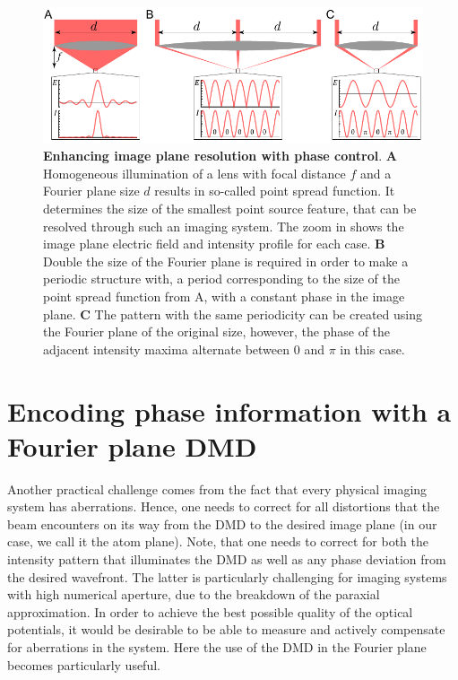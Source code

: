 \begin{figure}[t]
	\centering
	\includegraphics[scale=1]{figures/DMD_lens.pdf}
	\caption{{\bf Enhancing image plane resolution with phase control}. {\bf A} Homogeneous illumination of a lens with focal distance $f$ and a Fourier plane size $d$ results in so-called point spread function. It determines the size of the smallest point source feature, that can be resolved through such an imaging system. The zoom in shows the image plane electric field and intensity profile for each case. {\bf B} Double the size of the Fourier plane is required in order to make a periodic structure with, a period corresponding to the size of the point spread function from A, with a constant phase in the image plane. {\bf C} The pattern with the same periodicity can be created using the Fourier plane of the original size, however, the phase of the adjacent intensity maxima alternate between $0$ and $\pi$ in this case.}
	\label{fig:DMD_lens}
\end{figure}

\section{Encoding phase information with a Fourier plane DMD}
Another practical challenge comes from the fact that every physical imaging system has aberrations. Hence, one needs to correct for all distortions that the beam encounters on its way from the DMD to the desired image plane (in our case, we call it the atom plane). Note, that one needs to correct for both the intensity pattern that illuminates the DMD as well as any phase deviation from the desired wavefront. The latter is particularly challenging for imaging systems with high numerical aperture, due to the breakdown of the paraxial approximation. In order to achieve the best possible quality of the optical potentials, it would be desirable to be able to measure and actively compensate for aberrations in the system. Here the use of the DMD in the Fourier plane becomes particularly useful.

